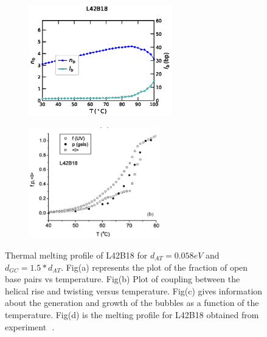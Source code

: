 \documentclass[12pt,masters,final]{UTRGVthesis}
\begin{document}
\begin{figure}[!h]
        \begin{subfigure}[b]{0.49\textwidth}
                \centering
                \includegraphics[height=1.9in, width=.8\textwidth]{L42B18_temp_bub.eps}
                \caption{}
                \label{fig:L42B18bub}
        \end{subfigure}%
        \begin{subfigure}[b]{0.49\textwidth}
                \centering
                \includegraphics[height=1.9in, width=.8\textwidth]{exp_L42B18.eps}
                \caption{}
                \label{fig:L42B18exp}
        \end{subfigure}%
       
       
\caption{Thermal melting profile of L42B18 for $d_{AT}=0.058 eV$ and $d_{GC}=1.5*d_{AT}$. Fig(a) represents the plot of the fraction of open base pairs vs temperature. Fig(b) Plot of coupling between the helical rise and twisting versus temperature. Fig(c) gives information about the generation and growth of the bubbles as a function of the temperature. Fig(d) is the melting profile for L42B18  obtained from experiment~\protect\cite{zeng2003length}\,.} 
\label{fig:L42b18cal}    

\end{figure}
%
\newpage
\end{document}
